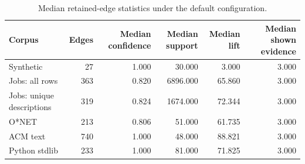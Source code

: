 \begin{table}[t]
  \caption{Median retained-edge statistics under the default configuration.}
  \label{tab:edge-distributions}
  \centering
  \small
  \begin{tabular}{@{}lrrrrr}
    \toprule
    Corpus & Edges & Median confidence & Median support & Median lift & Median shown evidence \\
    \midrule
    Synthetic & 27 & 1.000 & 30.000 & 3.000 & 3.000 \\
    Jobs: all rows & 363 & 0.820 & 6896.000 & 65.860 & 3.000 \\
    Jobs: unique descriptions & 319 & 0.824 & 1674.000 & 72.344 & 3.000 \\
    O*NET & 213 & 0.806 & 51.000 & 61.735 & 3.000 \\
    ACM text & 740 & 1.000 & 48.000 & 88.821 & 3.000 \\
    Python stdlib & 233 & 1.000 & 81.000 & 71.825 & 3.000 \\
    \bottomrule
  \end{tabular}
\end{table}
